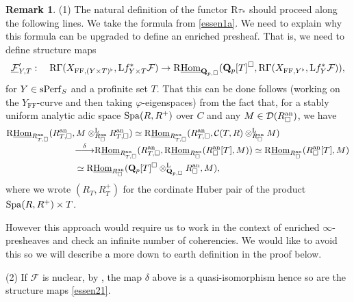 \documentclass[10pt]{amsart}
\theoremstyle{definition}
\newtheorem{remark}[equation]{Remark}
\theoremstyle{remark}
\def\lomapr#1{\smash{\mathop{\relbar\joinrel\longrightarrow}\limits^{#1}}}
\def\phi{\varphi}
\newcommand{\uHom}{\underline{{\rm{Hom}} }}
\newcommand{\LL}{\operatorname{L} }
\newcommand{\FF}{\operatorname{FF} }
\newcommand{\sff}{{\mathcal{F}}}
\newcommand{\scc}{{\mathcal{C}}}
\newcommand{\sd}{{\mathcal{D}}}
\numberwithin{equation}{section}
\def\R{{\mathrm R}}
\def\Q{{\bf Q}} \def\Z{{\bf Z}}
\numberwithin{equation}{section}
\begin{document}
\begin{remark} \label{essen1N} (1) The natural definition of the functor $\R\tau_*$ should proceed along the following lines. We take the formula from \eqref{essen1a}.  We need to explain why this formula can be upgraded to 
  define an  enriched presheaf. That is, we need to define  structure maps
\begin{equation}\label{essen21}
\underline{\sff}^{\prime}_{Y,T}: \quad \R\Gamma(X_{\FF,(Y\times T)^{\flat}},{\LL}f^*_{Y\times T}\sff)\to \R\uHom_{\Q_{p,\Box}}(\Q_p[T]^{\Box},\R\Gamma(X_{\FF,Y^{\flat}},{\LL}f^*_Y\sff)),
\end{equation}
for $Y\in {\rm sPerf}_S$ and a profinite set $T$. 
That this can be done  follows (working on the $Y_{\FF}$-curve and then taking $\phi$-eigenspaces) from the fact  that, for a stably  uniform analytic adic space ${\rm Spa}(R,R^+)$ over $C$ and  any $M\in \sd(R^{\rm an}_{\Box})$, we have 
\begin{align}\label{derived}
\R\uHom_{R^{\rm an}_{T,\Box}}(R^{\rm an}_{T,\Box}, &\, M\otimes^{\LL}_{R^{\rm an}_{\Box}}R^{\rm an}_{T,\Box})  \simeq \R\uHom_{R^{\rm an}_{T,\Box}}(R^{\rm an}_{T,\Box},\scc(T,R)\otimes^{\LL}_{R^{\rm an}_{\Box}} M)\\
 & \lomapr{\delta} \R\uHom_{R^{\rm an}_{T,\Box}}(R^{\rm an}_{T,\Box},\R\uHom_{R^{\rm an}_{\Box}}(R^{\rm an}_{\Box}[T],M))
 \simeq  \R\uHom_{R^{\rm an}_{\Box}}(R^{\rm an}_{\Box}[T], M)\notag \\
 & \simeq \R\uHom_{R^{\rm an}_{\Box}}(\Q_p[ T]^{\Box}\otimes^{\LL}_{\Q_{p,\Box}}R^{\rm an}_{\Box}, M),\notag
\end{align}
where we wrote  $(R_T,R_T^+)$ for the cordinate Huber pair of the product ${\rm Spa}(R,R^+)\times T$. 

 However this approach would require us to work in the context of enriched $\infty$-presheaves and check an infinite number of coherencies. We  would like to avoid this so we will describe  a more down to earth definition in the 
 proof below.
 
  (2)  If $\sff$ is nuclear, by \cite[Prop. 5.35]{And21}, the map $\delta$ above  is a quasi-isomorphism hence so are the structure maps \eqref{essen21}.  
\end{remark}
\end{document}
